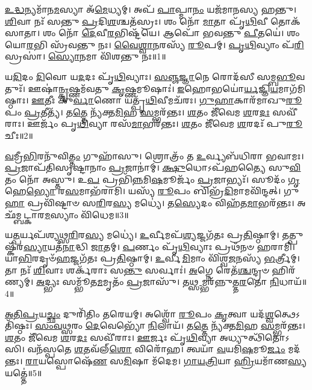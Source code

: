 \-\ul{𑌉}\-\-\ul{𑌦𑍍𑌧}\-𑌨𑍍𑌯𑌮𑌾᳴𑌨\-\ul{𑌮}\-𑌸𑍍𑌯𑌾 𑌅᳴\-\ul{𑌮𑍇}\-𑌧𑍍𑌯𑌮𑍍।
𑌅𑌪᳴ \ul{𑌪𑌾}\-𑌪𑍍𑌮𑌾\-\ul{𑌨𑌂} 𑌯𑌜᳴𑌮𑌾𑌨𑌸𑍍𑌯 𑌹𑌨𑍍𑌤𑍁।
\-\ul{𑌶𑌿}\-𑌵𑌾 𑌨𑌃᳴ 𑌸𑌨𑍍𑌤𑍁 \ul{𑌪𑍍𑌰}\-𑌦𑌿\-\ul{𑌶}\-𑌶𑍍𑌚𑌤᳴𑌸𑍍𑌰𑌃।
𑌶𑌂 𑌨𑍋᳴ \ul{𑌮𑌾}\-𑌤𑌾 𑌪𑍃᳴\-\ul{𑌥𑌿}\-𑌵𑍀 𑌤𑍋𑌕᳴𑌸𑌾𑌤𑌾।
𑌶𑌂 𑌨𑍋᳴ \ul{𑌦𑍇}\-𑌵𑍀\-\ul{𑌰}\-𑌭𑌿𑌷𑍍𑌟᳴𑌯𑍇।
𑌆𑌪𑍋᳴ 𑌭𑌵𑌨𑍍𑌤𑍁 \ul{𑌪𑍀}\-𑌤𑌯𑍇॑।
𑌶𑌂 𑌯𑍋\-\ul{𑌰}\-𑌭𑌿 𑌸𑍍𑌰᳴𑌵𑌨𑍍𑌤𑍁 𑌨𑌃।
\-\ul{𑌵𑍈}\-\-\ul{𑌶𑍍𑌵𑌾}\-\-\ul{𑌨}\-𑌰𑌸𑍍𑌯᳴ \ul{𑌰𑍂}\-𑌪𑌮𑍍।
\-\ul{𑌪𑍃}\-\-\ul{𑌥𑌿}\-𑌵𑍍𑌯𑌾𑌂 𑌪᳴\-\ul{𑌰𑌿}\-𑌸𑍍𑌰𑌸𑌾॑।
\-\ul{𑌸𑍍𑌯𑍋}\-𑌨𑌮𑌾 𑌵𑌿᳴𑌶𑌨𑍍𑌤𑍁 𑌨𑌃॥1॥

𑌯\-\ul{𑌦𑌿}\-𑌦𑌂 \ul{𑌦𑌿}\-𑌵𑍋 𑌯\-\ul{𑌦}\-𑌦𑌃 𑌪𑍃᳴\-\ul{𑌥𑌿}\-𑌵𑍍𑌯𑌾𑌃।
\-\ul{𑌸}\-\-\ul{𑌞𑍍𑌜}\-\-\ul{𑌜𑍍𑌞𑌾}\-𑌨𑍇 𑌰𑍋𑌦᳴𑌸𑍀 𑌸𑌮𑍍𑌬\-\ul{𑌭𑍂}\-𑌵𑌤𑍁𑌃᳴।
𑌊𑌷𑌾॑\-\ul{𑌨𑍍𑌕𑍃}\-𑌷𑍍𑌣𑌮᳴𑌵𑌤𑍁 \ul{𑌕𑍃}\-𑌷𑍍𑌣𑌮𑍂𑌷𑌾𑌃॑।
\-\ul{𑌇}\-𑌹𑍋𑌭𑌯𑍋॑\-\ul{𑌰𑍍𑌯}\-𑌜𑍍𑌞𑌿\-\ul{𑌯}\-\-𑌮𑌾𑌗᳴𑌮𑌿𑌷𑍍𑌠𑌾𑌃।
\-\ul{𑌊}\-𑌤𑍀𑌃 𑌕𑍁᳴\-\ul{𑌰𑍍𑌵𑌾}\-𑌣𑍋 𑌯𑌤𑍍𑌪𑍃᳴\-\ul{𑌥𑌿}\-𑌵𑍀𑌮𑌚᳴𑌰𑌃।
\-\ul{𑌗𑍁}\-\-\ul{𑌹𑌾}\-𑌕𑌾𑌰᳴𑌮𑌾𑌖𑍁\-\ul{𑌰𑍂}\-𑌪𑌂 \ul{𑌪𑍍𑌰}\-𑌤𑍀𑌤𑍍𑌯᳴।
𑌤\-\ul{𑌤𑍍𑌤𑍇} 𑌨𑍍𑌯᳴𑌕𑍍𑌤\-\ul{𑌮𑌿}\-𑌹 \ul{𑌸}\-𑌮𑍍𑌭𑌰᳴𑌨𑍍𑌤𑌃।
\-\ul{𑌶}\-𑌤𑌂 𑌜𑍀᳴𑌵𑍇𑌮 \ul{𑌶}\-𑌰\-\ul{𑌦𑌃} 𑌸𑌵𑍀᳴𑌰𑌾𑌃।
𑌊𑌰𑍍𑌜𑌂᳴ 𑌪𑍃\-\ul{𑌥𑌿}\-𑌵𑍍𑌯𑌾 𑌰𑌸᳴\-\ul{𑌮𑌾}\-𑌭𑌰᳴𑌨𑍍𑌤𑌃।
\-\ul{𑌶}\-𑌤𑌂 𑌜𑍀᳴𑌵𑍇𑌮 \ul{𑌶}\-𑌰𑌦𑌃᳴ 𑌪𑍁\-\ul{𑌰𑍂}\-𑌚𑍀𑌃॥2॥

\-\ul{𑌵}\-𑌮𑍍𑌰𑍀\-\ul{𑌭𑌿}\-𑌰𑌨𑍁᳴\-𑌵𑌿\-\ul{𑌤𑍍𑌤𑌂} 𑌗𑍁𑌹𑌾᳴𑌸𑍁।
𑌶𑍍𑌰𑍋𑌤𑍍𑌰𑌂᳴ 𑌤 \ul{𑌉}\-𑌰𑍍𑌵𑍍𑌯𑌬᳴𑌧𑌿𑌰𑌾 𑌭𑌵𑌾𑌮𑌃।
\-\ul{𑌪𑍍𑌰}\-𑌜𑌾𑌪᳴𑌤𑌿𑌸𑍃𑌷𑍍𑌟𑌾𑌨𑌾𑌂 \ul{𑌪𑍍𑌰}\-𑌜𑌾𑌨𑌾॑𑌮𑍍।
\-\ul{𑌕𑍍𑌷𑍁}\-𑌧𑍋\-𑌽𑌪᳴𑌹𑌤𑍍𑌯𑍈 𑌸𑍁\-\ul{𑌵𑌿}\-𑌤𑌂 𑌨𑍋᳴ 𑌅𑌸𑍍𑌤𑍁।
𑌉\-\ul{𑌪} 𑌪𑍍𑌰𑌭𑌿᳴\-\ul{𑌨𑍍𑌨}\-𑌮𑌿\-\ul{𑌷}\-𑌮𑍂𑌰𑍍𑌜𑌂᳴ \ul{𑌪𑍍𑌰}\-𑌜𑌾𑌭𑍍𑌯𑌃᳴।
𑌸𑍂𑌦𑌂᳴ \ul{𑌗𑍃}\-𑌹𑍇\-\ul{𑌭𑍍𑌯𑍋} 𑌰\-\ul{𑌸}\-𑌮𑌾𑌭᳴𑌰𑌾𑌮𑌿।
𑌯𑌸𑍍𑌯᳴ \ul{𑌰𑍂}\-𑌪𑌂 𑌬𑌿𑌭𑍍𑌰᳴\-\ul{𑌦𑌿}\-𑌮𑌾𑌮𑌵𑌿᳴𑌨𑍍𑌦𑌤𑍍।
𑌗𑍁\-\ul{𑌹𑌾} 𑌪𑍍𑌰𑌵𑌿᳴𑌷𑍍𑌟𑌾𑍞 𑌸\-\ul{𑌰𑌿}\-𑌰\-\ul{𑌸𑍍𑌯} 𑌮𑌧𑍍𑌯𑍇॑।
𑌤\-\ul{𑌸𑍍𑌯𑍇}\-𑌦𑌂 𑌵𑌿𑌹᳴𑌤\-\ul{𑌮𑌾}\-𑌭𑌰᳴𑌨𑍍𑌤𑌃।
𑌅𑌛᳴𑌮𑍍𑌬𑌟𑍍𑌕𑌾𑌰\-\ul{𑌮}\-𑌸𑍍𑌯𑌾𑌂 𑌵𑌿᳴𑌧𑍇𑌮॥3॥

𑌯\-\ul{𑌤𑍍𑌪}\-𑌰𑍍𑌯𑌪᳴𑌶𑍍𑌯𑌥𑍍𑌸\-\ul{𑌰𑌿}\-𑌰\-\ul{𑌸𑍍𑌯} 𑌮𑌧𑍍𑌯𑍇॑।
\-\ul{𑌉}\-𑌰𑍍𑌵𑍀𑌮𑌪᳴\-\ul{𑌶𑍍𑌯}\-𑌜𑍍𑌜𑌗᳴𑌤𑌃 𑌪𑍍𑌰\-\ul{𑌤𑌿}\-𑌷𑍍𑌠𑌾𑌮𑍍।
𑌤𑌤𑍍𑌪𑍁𑌷𑍍𑌕᳴𑌰\-\ul{𑌸𑍍𑌯𑌾}\-𑌯𑌤᳴\-\ul{𑌨𑌾}\-𑌦𑍍𑌧𑌿 \ul{𑌜𑌾}\-𑌤𑌮𑍍।
\-\ul{𑌪}\-𑌰𑍍𑌣𑌂 𑌪𑍃᳴\-\ul{𑌥𑌿}\-𑌵𑍍𑌯𑌾𑌃 𑌪𑍍𑌰𑌥᳴𑌨𑍞 𑌹𑌰𑌾𑌮𑌿।
𑌯𑌾\-\ul{𑌭𑌿}\-𑌰𑌦𑍃𑍞᳴\-\ul{𑌹}\-𑌜𑍍𑌜𑌗᳴𑌤𑌃 𑌪𑍍𑌰\-\ul{𑌤𑌿}\-𑌷𑍍𑌠𑌾𑌮𑍍।
\-\ul{𑌉}\-𑌰𑍍𑌵𑍀\-\ul{𑌮𑌿}\-𑌮𑌾𑌂 𑌵𑌿᳴𑌶𑍍𑌵\-\ul{𑌜}\-𑌨𑌸𑍍𑌯᳴ \ul{𑌭}\-𑌰𑍍𑌤𑍍𑌰𑍀𑌮𑍍।
𑌤𑌾 𑌨𑌃᳴ \ul{𑌶𑌿}\-𑌵𑌾𑌃 𑌶𑌰𑍍𑌕᳴𑌰𑌾𑌃 𑌸\-\ul{𑌨𑍍𑌤𑍁} 𑌸𑌰𑍍𑌵𑌾𑌃॑।
\-\ul{𑌅}\-𑌗𑍍𑌨𑍇 𑌰𑍇𑌤᳴\-\ul{𑌶𑍍𑌚}\-𑌨𑍍𑌦𑍍𑌰𑍞 𑌹𑌿𑌰᳴𑌣𑍍𑌯𑌮𑍍।
\-\ul{𑌅}\-𑌦𑍍𑌭𑍍𑌯𑌃 𑌸𑌮𑍍𑌭𑍂᳴𑌤\-\ul{𑌮}\-𑌮𑍃𑌤𑌂᳴ \ul{𑌪𑍍𑌰}\-𑌜𑌾𑌸𑍁᳴।
𑌤\-\ul{𑌥𑍍𑌸}\-𑌮𑍍𑌭𑌰᳴𑌨𑍍𑌨𑍁𑌤𑍍𑌤\-\ul{𑌰}\-𑌤𑍋 \ul{𑌨𑌿}\-𑌧𑌾𑌯᳴॥4॥

\-\ul{𑌅}\-\-\ul{𑌤𑌿}\-\-\ul{𑌪𑍍𑌰}\-𑌯\-\ul{𑌚𑍍𑌛𑌂} 𑌦𑍁𑌰𑌿᳴𑌤𑌿𑌂 𑌤𑌰𑍇𑌯𑌮𑍍।
𑌅𑌶𑍍𑌵𑍋᳴ \ul{𑌰𑍂}\-𑌪𑌂 \ul{𑌕𑍃}\-𑌤𑍍𑌵𑌾 𑌯𑌦᳴\-\ul{𑌶𑍍𑌵}\-𑌤𑍍𑌥𑍇\-𑌽𑌤𑌿᳴𑌷𑍍𑌠𑌃।
\-\ul{𑌸𑌂}\-\-\ul{𑌵}\-\-\ul{𑌥𑍍𑌸}\-𑌰𑌂 \ul{𑌦𑍇}\-𑌵𑍇𑌭𑍍𑌯𑍋᳴ \ul{𑌨𑌿}\-𑌲𑌾𑌯᳴।
𑌤\-\ul{𑌤𑍍𑌤𑍇} 𑌨𑍍𑌯᳴𑌕𑍍𑌤\-\ul{𑌮𑌿}\-𑌹 \ul{𑌸}\-𑌮𑍍𑌭𑌰᳴𑌨𑍍𑌤𑌃।
\-\ul{𑌶}\-𑌤𑌂 𑌜𑍀᳴𑌵𑍇𑌮 \ul{𑌶}\-𑌰\-\ul{𑌦𑌃} 𑌸𑌵𑍀᳴𑌰𑌾𑌃।
\-\ul{𑌊}\-𑌰𑍍𑌜𑌃 𑌪𑍃᳴\-\ul{𑌥𑌿}\-𑌵𑍍𑌯𑌾 𑌅𑌧𑍍𑌯𑍁𑌤𑍍𑌥𑌿᳴𑌤𑍋𑌽𑌸𑌿।
𑌵𑌨᳴𑌸𑍍𑌪𑌤𑍇 \ul{𑌶}\-𑌤𑌵᳴𑌲𑍍‌\-\ul{𑌶𑍋} 𑌵𑌿𑌰𑍋᳴𑌹।
𑌤𑍍𑌵𑌯𑌾᳴ \ul{𑌵}\-𑌯𑌮𑌿\-\ul{𑌷}\-𑌮𑍂\-\ul{𑌰𑍍𑌜𑌂} 𑌮𑌦᳴𑌨𑍍𑌤𑌃।
\-\ul{𑌰𑌾}\-𑌯𑌸𑍍𑌪𑍋𑌷𑍇᳴\-\ul{𑌣} 𑌸\-\ul{𑌮𑌿}\-𑌷𑌾 𑌮᳴𑌦𑍇𑌮।
\-\ul{𑌗𑌾}\-\-\ul{𑌯}\-\-\ul{𑌤𑍍𑌰𑌿}\-𑌯𑌾 \ul{𑌹𑍍𑌰𑌿}\-𑌯𑌮𑌾᳴𑌣\-\ul{𑌸𑍍𑌯} 𑌯𑌤𑍍𑌤𑍇॑॥5॥

